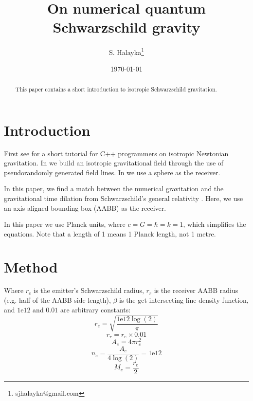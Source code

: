\documentclass[12pt]{article}
\title{On numerical quantum Schwarzschild gravity}
\author{S. Halayka\footnote{sjhalayka@gmail.com}}
\date{\today\;\currenttime}
\begin{document}
 
\maketitle

\begin{abstract}
This paper contains a short introduction to isotropic Schwarzschild gravitation.
\end{abstract}




\section{Introduction}

First see \cite{halayka} for a short tutorial for C++ programmers on isotropic Newtonian gravitation.
In \cite{halayka} we build an isotropic gravitational field through the use of pseudorandomly generated field lines.
In \cite{halayka} we use a sphere as the receiver.

In this paper, we find a match between the numerical gravitation and the gravitational time dilation from Schwarzschild's general relativity \cite{hooft, susskind, misner}.
Here, we use an axis-aligned bounding box (AABB) as the receiver.

In this paper we use Planck units, where $c = G = \hbar = k = 1$, which simplifies the equations.
Note that a length of 1 means 1 Planck length, not 1 metre.


\section{Method}

Where $r_{e}$ is the emitter's Schwarzschild radius, $r_{r}$ is the receiver AABB radius (e.g. half of the AABB side length), $\beta$ is the get intersecting line density function, and $1\mathrm{e}12$ and $0.01$ are arbitrary constants:
\begin{equation}
r_{e} = \sqrt{\frac{1\mathrm{e}12 \log(2)}{\pi}}
\end{equation}
\begin{equation}
r_{r} = r_{e} \times 0.01
\end{equation}
\begin{equation}
A_{e} = 4 \pi r_{e}^2
\end{equation}
\begin{equation}
n_{e} = \frac{A_{e}}{4 \log(2)} = 1\mathrm{e}12
\end{equation}
\begin{equation}
M_{e} = \frac{r_{e}}{2}
\end{equation}
\end{document}

